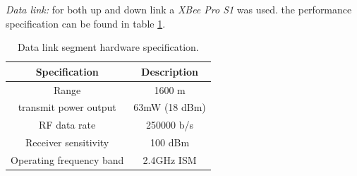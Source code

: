 \textit{Data link:}
for both up and down link a \textit{XBee Pro S1} was used. the performance specification can be found in table \ref{Table:XBee}.
\begin{table}[H]
\centering
\begin{tabular}{|c|c|}
\hline
Specification           & Description   \\ \hline
Range                    & 1600 m        \\ \hline
transmit power output    & 63mW (18 dBm) \\ \hline
RF data rate             & 250000 b/s    \\ \hline
Receiver sensitivity     & 100 dBm       \\ \hline
Operating frequency band & 2.4GHz ISM    \\ \hline
\end{tabular}
\caption{Data link segment hardware specification.}
\label{Table:XBee}
\end{table}


